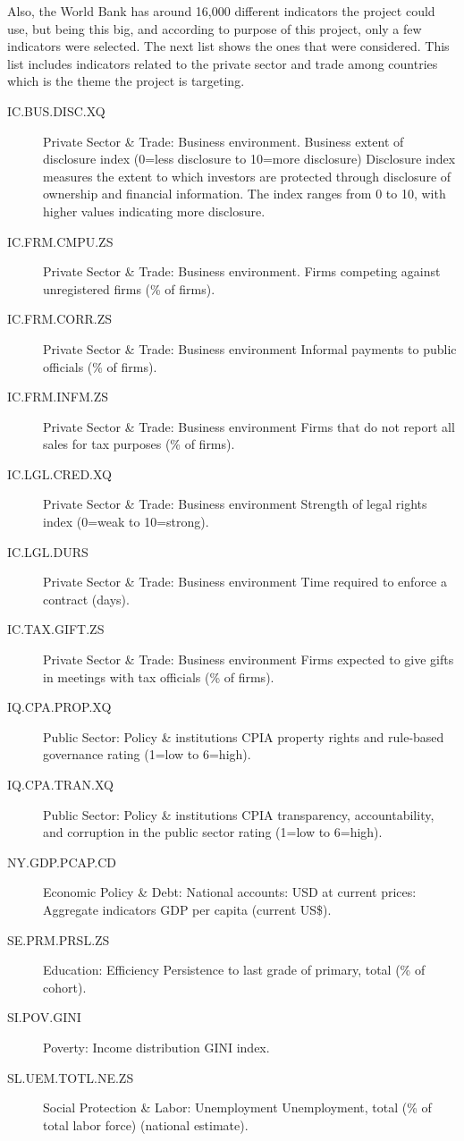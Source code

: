 Also, the World Bank has around 16,000 different indicators the project could use, but being this big, and according to purpose of this project, only a few indicators were selected. The next list shows the ones that were considered. This list includes indicators related to the private sector and trade among countries which is the theme the project is targeting.

\begin{description}
\item[IC.BUS.DISC.XQ]	Private Sector \& Trade: Business environment. Business extent of disclosure index (0=less disclosure to 10=more disclosure)	Disclosure index measures the extent to which investors are protected through disclosure of ownership and financial information. The index ranges from 0 to 10, with higher values indicating more disclosure.
\item[IC.FRM.CMPU.ZS]	Private Sector \& Trade: Business environment. Firms competing against unregistered firms (\% of firms).
\item[IC.FRM.CORR.ZS]	Private Sector \& Trade: Business environment	Informal payments to public officials (\% of firms).
\item[IC.FRM.INFM.ZS]	Private Sector \& Trade: Business environment	Firms that do not report all sales for tax purposes (\% of firms).
\item[IC.LGL.CRED.XQ]	Private Sector \& Trade: Business environment	Strength of legal rights index (0=weak to 10=strong).
\item[IC.LGL.DURS]	Private Sector \& Trade: Business environment	Time required to enforce a contract (days).
\item[IC.TAX.GIFT.ZS]	Private Sector \& Trade: Business environment	Firms expected to give gifts in meetings with tax officials (\% of firms).
\item[IQ.CPA.PROP.XQ]	Public Sector: Policy \& institutions	CPIA property rights and rule-based governance rating (1=low to 6=high).
\item[IQ.CPA.TRAN.XQ]	Public Sector: Policy \& institutions	CPIA transparency, accountability, and corruption in the public sector rating (1=low to 6=high).
\item[NY.GDP.PCAP.CD]	Economic Policy \& Debt: National accounts: USD at current prices: Aggregate indicators	GDP per capita (current US\$).
\item[SE.PRM.PRSL.ZS]	Education: Efficiency	Persistence to last grade of primary, total (\% of cohort).
\item[SI.POV.GINI]	Poverty: Income distribution GINI index.
\item[SL.UEM.TOTL.NE.ZS]	Social Protection \& Labor: Unemployment	Unemployment, total (\% of total labor force) (national estimate).
\end{description}

